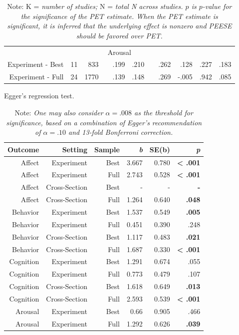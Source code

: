 \documentclass[man, mask]{apa6}
\begin{document}
\begin{table}[htbp]
\begin{tabular}{rrrrrrrrrrr}
		\multicolumn{11}{c}{Arousal} \\
		Experiment - Best & 11    & 833   &       & .199 & .210 &       & .262 & .128 & .227 & .183 \\
		Experiment - Full & 24    & 1770  &       & .139 & .148 &       & .269 & -.005 & .942 & .085 \\
		\bottomrule
	\end{tabular}
	\label{table:adjustment}
	\caption*{Note: K = {\em number of studies;} N = {\em total N across studies. $p$ is $p$-value for the significance of the PET estimate. When the PET estimate is significant, it is inferred that the underlying effect is nonzero and PEESE should be favored over PET.}}
\end{table}

\begin{table}[htbp]
	\centering
	\caption{Egger's regression test.}
	\begin{tabular}{rrrrrr}
		\toprule
		Outcome & Setting & Sample & \textit{b} & SE(b) & \textit{p} \\
		\midrule
		Affect & Experiment & Best  & 3.667 & 0.780 & \textbf{< .001} \\
		Affect & Experiment & Full  & 2.743 & 0.528 & \textbf{< .001} \\
		Affect & Cross-Section & Best  & -     & -     & \textbf{-} \\
		Affect & Cross-Section & Full  & 1.264 & 0.640 & \textbf{.048} \\
		Behavior & Experiment & Best  & 1.537 & 0.549 & \textbf{.005} \\
		Behavior & Experiment & Full  & 0.451 & 0.390 & .248 \\
		Behavior & Cross-Section & Best  & 1.117 & 0.483 & \textbf{.021} \\
		Behavior & Cross-Section & Full  & 1.687 & 0.330 & \textbf{< .001} \\
		Cognition & Experiment & Best  & 1.291 & 0.674 & .055 \\
		Cognition & Experiment & Full  & 0.773 & 0.479 & .107 \\
		Cognition & Cross-Section & Best  & 1.618 & 0.649 & \textbf{.013} \\
		Cognition & Cross-Section & Full  & 2.593 & 0.539 & \textbf{< .001} \\
		Arousal & Experiment & Best  & 0.66  & 0.905 & .466 \\
		Arousal & Experiment & Full  & 1.292 & 0.626 & \textbf{.039} \\
		\bottomrule
	\end{tabular}%
	\label{table:Egger}%
	\caption*{Note: {\em One may also consider $\alpha = .008$ as the threshold for significance, based on a combination of Egger's recommendation of $\alpha = .10$ and 13-fold Bonferroni correction.}}
\end{table}
\end{document}
